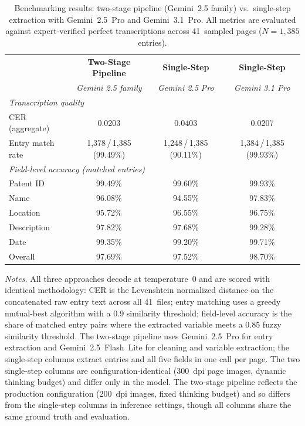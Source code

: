 \begin{table}[t]
\centering
\caption{Benchmarking results: two-stage pipeline (Gemini~2.5 family) vs.\ single-step extraction with Gemini~2.5~Pro and Gemini~3.1~Pro. All metrics are evaluated against expert-verified perfect transcriptions across 41~sampled pages ($N = 1{,}385$ entries).}
\label{tab:pipeline_comparison}
\begin{tabular}{lccc}
\toprule
 & \textbf{Two-Stage Pipeline} & \textbf{Single-Step} & \textbf{Single-Step} \\
 & \textit{Gemini 2.5 family} & \textit{Gemini 2.5 Pro} & \textit{Gemini 3.1 Pro} \\
\midrule
\multicolumn{4}{l}{\textit{Transcription quality}} \\[2pt]
CER (aggregate) & 0.0203 & 0.0403 & 0.0207 \\
Entry match rate & 1{,}378\,/\,1{,}385 (99.49\%) & 1{,}248\,/\,1{,}385 (90.11\%) & 1{,}384\,/\,1{,}385 (99.93\%) \\
\midrule
\multicolumn{4}{l}{\textit{Field-level accuracy (matched entries)}} \\[2pt]
Patent ID & 99.49\% & 99.60\% & 99.93\% \\
Name & 96.08\% & 94.55\% & 97.83\% \\
Location & 95.72\% & 96.55\% & 96.75\% \\
Description & 97.82\% & 97.68\% & 99.28\% \\
Date & 99.35\% & 99.20\% & 99.71\% \\
\midrule
Overall & 97.69\% & 97.52\% & 98.70\% \\
\bottomrule
\end{tabular}
\begin{tablenotes}
\small
\item \textit{Notes.} All three approaches decode at temperature~$0$ and are scored with identical methodology: CER is the Levenshtein normalized distance on the concatenated raw entry text across all 41~files; entry matching uses a greedy mutual-best algorithm with a 0.9 similarity threshold; field-level accuracy is the share of matched entry pairs where the extracted variable meets a 0.85 fuzzy similarity threshold. The two-stage pipeline uses Gemini~2.5~Pro for entry extraction and Gemini~2.5~Flash~Lite for cleaning and variable extraction; the single-step columns extract entries and all five fields in one call per page. The two single-step columns are configuration-identical (300~dpi page images, dynamic thinking budget) and differ only in the model. The two-stage pipeline reflects the production configuration (200~dpi images, fixed thinking budget) and so differs from the single-step columns in inference settings, though all columns share the same ground truth and evaluation.
\end{tablenotes}
\end{table}
